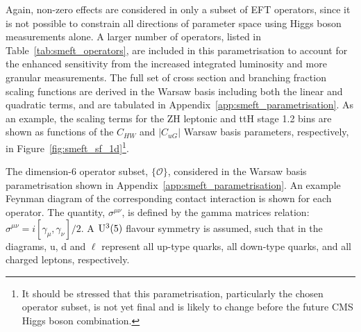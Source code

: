 Again, non-zero effects are considered in only a subset of EFT operators, since it is not possible to constrain all directions of parameter space using Higgs boson measurements alone. A larger number of operators, listed in Table~\ref{tab:smeft_operators}, are included in this parametrisation to account for the enhanced sensitivity from the increased integrated luminosity and more granular measurements. The full set of cross section and branching fraction scaling functions are derived in the Warsaw basis including both the linear and quadratic terms, and are tabulated in Appendix~\ref{app:smeft_parametrisation}. As an example, the scaling terms for the ZH leptonic and ttH stage 1.2 bins are shown as functions of the $C_{HW}$ and $|C_{uG}|$ Warsaw basis parameters, respectively, in Figure~\ref{fig:smeft_sf_1d}\footnote{It should be stressed that this parametrisation, particularly the chosen operator subset, is not yet final and is likely to change before the future CMS Higgs boson combination.}.

\begin{table}[htb!]
  \centering
  \scriptsize
  \renewcommand{\arraystretch}{2.3}
  \setlength{\tabcolsep}{3pt}
  \caption[Operator subset in the Warsaw basis parametrisation]
  {
    The dimension-6 operator subset, $\{\mathcal{O}\}$, considered in the Warsaw basis parametrisation shown in Appendix~\ref{app:smeft_parametrisation}. An example Feynman diagram of the corresponding contact interaction is shown for each operator. The quantity, $\sigma^{\mu\nu}$, is defined by the gamma matrices relation: $\sigma^{\mu\nu}=i[\gamma_\mu,\gamma_\nu]/2$. A ${\rm{U}^3(5)}$ flavour symmetry is assumed, such that in the diagrams, u, d and $\ell$ represent all up-type quarks, all down-type quarks, and all charged leptons, respectively.
  }
  \label{tab:smeft_operators}
  
\end{table}

